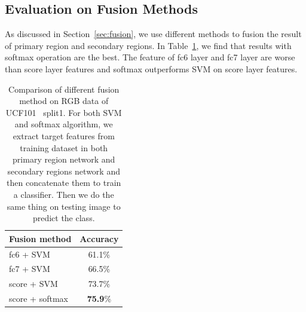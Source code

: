 \documentclass[10pt,twocolumn,letterpaper]{article}
\begin{document}
\subsection{Evaluation on Fusion Methods}
As discussed in Section~\ref{sec:fusion}, we use different methods to fusion the result of primary region and secondary regions. In Table~\ref{table:fusion_ps}, we find that results with softmax operation are the best. The feature of fc6 layer and fc7 layer are worse than score layer features and softmax outperforms SVM on score layer features.  
\begin{table}
	\begin{center}
		\begin{tabular}{|l|c|}
			\hline
			Fusion method							& Accuracy \\		
			\hline												
			fc6 + SVM								& 61.1\% \\
			fc7 + SVM								& 66.5\% \\
			score + SVM								& 73.7\% \\
			score + softmax 						& \textbf{75.9}\% \\
			
			\hline																				
		\end{tabular}
	\end{center}
	\caption{Comparison of different fusion method on RGB data of UCF101~\cite{soomro2012ucf101} split1. For both SVM and softmax algorithm, we extract target features from training dataset in both primary region network and secondary regions network and then concatenate them to train a classifier. Then we do the same thing on testing image to predict the class.}
	\label{table:fusion_ps}
\end{table}
\end{document}

